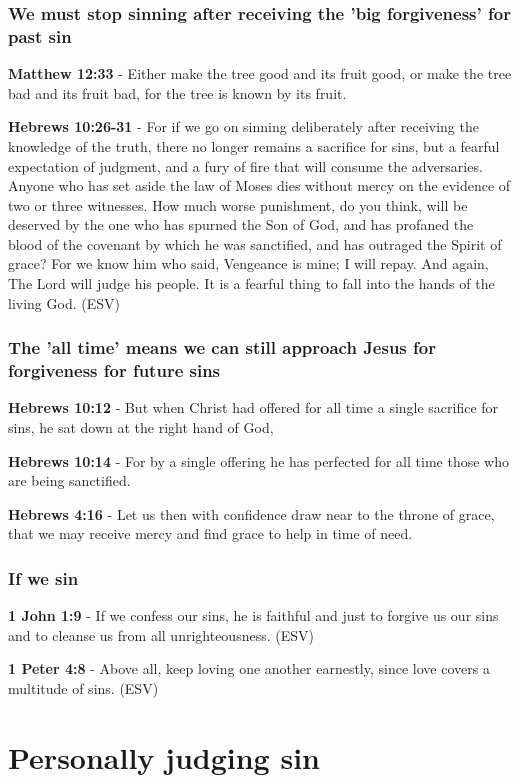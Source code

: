 \documentclass[11pt]{article}
\begin{document}
\subsubsection{We must stop sinning after receiving the 'big forgiveness' for past sin}
\label{sec:org75dc695}
\textbf{Matthew 12:33} - Either make the tree good and its fruit good, or make the tree bad and its fruit bad, for the tree is known by its fruit.

\textbf{Hebrews 10:26-31} - For if we go on sinning deliberately after receiving the knowledge of the truth, there no longer remains a sacrifice for sins, but a fearful expectation of judgment, and a fury of fire that will consume the adversaries. Anyone who has set aside the law of Moses dies without mercy on the evidence of two or three witnesses. How much worse punishment, do you think, will be deserved by the one who has spurned the Son of God, and has profaned the blood of the covenant by which he was sanctified, and has outraged the Spirit of grace? For we know him who said, Vengeance is mine; I will repay. And again, The Lord will judge his people. It is a fearful thing to fall into the hands of the living God. (ESV)

\subsubsection{The 'all time' means we can still approach Jesus for forgiveness for future sins}
\label{sec:orgfa7ce2e}
\textbf{Hebrews 10:12} - But when Christ had offered for all time a single sacrifice for sins, he sat down at the right hand of God,

\textbf{Hebrews 10:14} - For by a single offering he has perfected for all time those who are being sanctified.

\textbf{Hebrews 4:16} - Let us then with confidence draw near to the throne of grace, that we may receive mercy and find grace to help in time of need.

\subsubsection{If we sin}
\label{sec:org1ef68ce}
\textbf{1 John 1:9} -  If we confess our sins, he is faithful and just to forgive us our sins and to cleanse us from all unrighteousness.  (ESV)

\textbf{1 Peter 4:8} -  Above all, keep loving one another earnestly, since love covers a multitude of sins.  (ESV)

\section{Personally judging sin}
\label{sec:orgc7408d6}
\end{document}
